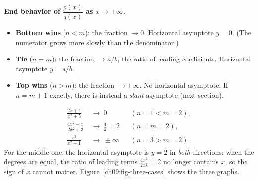 \begin{focusbox}
\textbf{End behavior of $\dfrac{p(x)}{q(x)}$ as $x\to\pm\infty$.}
\begin{itemize}
\item \textbf{Bottom wins} ($n<m$): the fraction $\to 0$. Horizontal asymptote
$y=0$. (The numerator grows more slowly than the denominator.)
\item \textbf{Tie} ($n=m$): the fraction $\to a/b$, the ratio of leading
coefficients. Horizontal asymptote $y=a/b$.
\item \textbf{Top wins} ($n>m$): the fraction $\to \pm\infty$. No horizontal
asymptote. If $n=m+1$ exactly, there is instead a \emph{slant} asymptote
(next section).
\end{itemize}
\end{focusbox}

\begin{example}
\label{ch09:ex-three-cases}
\begin{align*}
\frac{2x+1}{x^2+5} &\ \to\ 0
&&(n=1<m=2),\\
\frac{4x^2-x}{2x^2+3} &\ \to\ \frac{4}{2}=2
&&(n=m=2),\\
\frac{x^3}{x^2+1} &\ \to\ \pm\infty
&&(n=3>m=2).
\end{align*}
For the middle one, the horizontal asymptote is $y=2$ in \emph{both} directions:
when the degrees are equal, the ratio of leading terms $\frac{4x^2}{2x^2}=2$ no
longer contains $x$, so the sign of $x$ cannot matter.
Figure~\ref{ch09:fig-three-cases} shows the three graphs.
\end{example}

